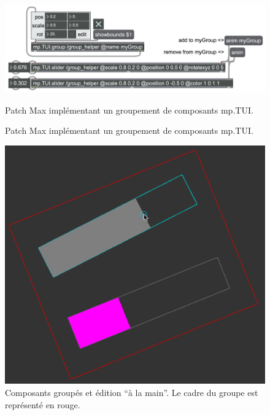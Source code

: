 \begin{figure}[!htbp]
	\captionsetup{format=plain}%
	\centering
	\begin{minipage}[t]{0.48\textwidth}
		\includegraphics[width=\linewidth]{gfx/06_visual_representation/mpTUI_groups_patcher.png}
		\caption{Patch Max implémentant un groupement de composants mp.TUI.}{Patch Max implémentant un groupement de composants mp.TUI.}
		\label{fig:visual_representation:groups_patch}
	\end{minipage}
	\hspace{.02\linewidth}
	\begin{minipage}[t]{0.48\textwidth}
	    \includegraphics[width=\linewidth]{gfx/06_visual_representation/mpTUI_groups.png}
		\caption[Composants mp.TUI groupés]{Composants groupés et édition ``à la main''. Le cadre du groupe est représenté en rouge.}
		\label{fig:visual_representation:groups}
	\end{minipage}
\end{figure}

